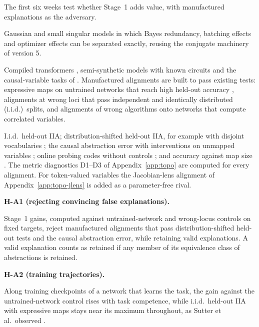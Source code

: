\documentclass[11pt,a4paper]{article}
\newenvironment{hypbox}[1]{%
  \def\FrameCommand{{\color{chyp}\vrule width 1.6pt}\hspace{8pt}}%
  \MakeFramed{\advance\hsize-\width\FrameRestore}%
  \noindent\textbf{#1}\par\smallskip\noindent\ignorespaces}{\endMakeFramed}
\begin{document}
The first six weeks test whether Stage~1 adds value, with manufactured
explanations as the adversary.
\begin{description}[style=nextline,leftmargin=1.5em]
\item[Exact examples, weeks 1--2.] Gaussian and small singular models in
which Bayes redundancy, batching effects and optimizer effects can be
separated exactly, reusing the conjugate machinery of version 5.
\item[Ground truth and manufactured alignments, weeks 3--4.] Compiled
transformers \cite{tracr2023}, semi-synthetic models with known circuits
\cite{interpbench2024} and the causal-variable tasks of \cite{mib2025}.
Manufactured alignments are built to pass existing tests: expressive maps
on untrained networks that reach high held-out accuracy
\cite{sutter2025}, alignments at wrong loci that pass independent and
identically distributed (i.i.d.)\ splits, and alignments of wrong
algorithms onto networks that compute correlated variables.
\item[Strong baselines on unseen tasks, weeks 5--6.] I.i.d.\ held-out IIA;
distribution-shifted held-out IIA, for example with disjoint vocabularies
\cite{sutter2025}; the causal abstraction error with interventions on
unmapped variables \cite{meloux2026}; online probing codes without controls
\cite{voita2020}; and accuracy against map size \cite{pimentel2020pareto}.
The metric diagnostics D1--D3 of Appendix~\ref{app:topo} are computed for
every alignment.
For token-valued variables the Jacobian-lens alignment of
Appendix~\ref{app:topo-jlens} is added as a parameter-free rival.
\end{description}

\begin{hypbox}{H-A1 (rejecting convincing false explanations).}
Stage~1 gains, computed against untrained-network and wrong-locus controls
on fixed targets, reject manufactured alignments that pass
distribution-shifted held-out tests and the causal abstraction error, while
retaining valid explanations. A valid explanation counts as retained if
any member of its equivalence class of abstractions is retained.
\end{hypbox}

\begin{hypbox}{H-A2 (training trajectories).}
Along training checkpoints of a network that learns the task, the gain
against the untrained-network control rises with task competence, while
i.i.d.\ held-out IIA with expressive maps stays near its maximum throughout,
as Sutter et al.\ observed \cite{sutter2025}.
\end{hypbox}
\end{document}

